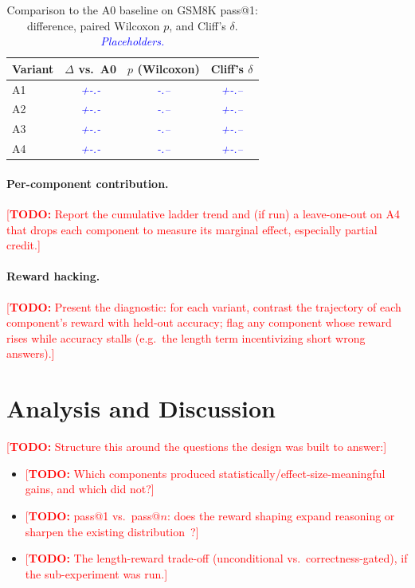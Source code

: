 \documentclass[11pt]{article}
\newcommand{\todo}[1]{\textcolor{red}{[\textbf{TODO:} #1]}}
\newcommand{\res}[1]{\textcolor{blue}{\textit{#1}}}   %
\begin{document}
\begin{table}[t]
  \centering
  \caption{Comparison to the A0 baseline on GSM8K pass@1: difference, paired
  Wilcoxon $p$, and Cliff's $\delta$. \res{Placeholders.}}
  \label{tab:stats}
  \begin{tabular}{lccc}
    \toprule
    Variant & $\Delta$ vs.\ A0 & $p$ (Wilcoxon) & Cliff's $\delta$ \\
    \midrule
    A1 & \res{+-.-} & \res{-.--} & \res{+-.--} \\
    A2 & \res{+-.-} & \res{-.--} & \res{+-.--} \\
    A3 & \res{+-.-} & \res{-.--} & \res{+-.--} \\
    A4 & \res{+-.-} & \res{-.--} & \res{+-.--} \\
    \bottomrule
  \end{tabular}
\end{table}

\paragraph{Per-component contribution.}
\todo{Report the cumulative ladder trend and (if run) a leave-one-out on A4 that
drops each component to measure its marginal effect, especially partial credit.}

\paragraph{Reward hacking.}
\todo{Present the diagnostic: for each variant, contrast the trajectory of each
component's reward with held-out accuracy; flag any component whose reward rises
while accuracy stalls (e.g.\ the length term incentivizing short wrong answers).}

\section{Analysis and Discussion}
\todo{Structure this around the questions the design was built to answer:}
\begin{itemize}
  \item \todo{Which components produced statistically/effect-size-meaningful
  gains, and which did not?}
  \item \todo{pass@1 vs.\ pass@$n$: does the reward shaping expand reasoning or
  sharpen the existing distribution~\citep{yue2025}?}
  \item \todo{The length-reward trade-off (unconditional vs.\ correctness-gated),
  if the sub-experiment was run.}
\end{itemize}
\end{document}
